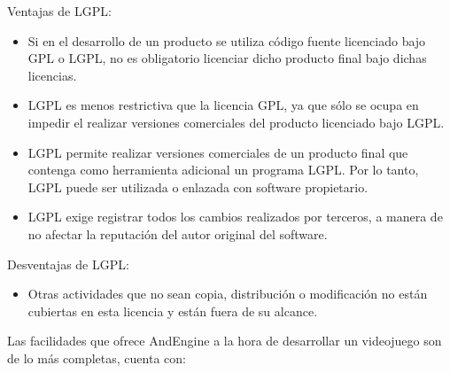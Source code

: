\documentclass[12 pt, a4paper, twoside]{article}
\begin{document}
Ventajas de LGPL:
\begin{itemize}
\item Si en el desarrollo de un producto se utiliza código fuente
  licenciado bajo GPL o LGPL, no es obligatorio licenciar dicho
  producto final bajo dichas licencias.
\item LGPL es menos restrictiva que la licencia GPL, ya que sólo se
  ocupa en impedir el realizar versiones comerciales del producto
  licenciado bajo LGPL.
\item LGPL permite realizar versiones comerciales de un
  producto final que contenga como herramienta adicional un programa
  LGPL. Por lo tanto, LGPL puede ser utilizada o enlazada con software
  propietario.
\item LGPL exige registrar todos los cambios realizados por terceros,
  a manera de no afectar la reputación del autor original del
  software.
\end{itemize}

Desventajas de LGPL:
\begin{itemize}
\item Otras actividades que no sean copia, distribución o modificación
  no están cubiertas en esta licencia y están fuera de su alcance.
\end{itemize}

\clearpage
Las facilidades que ofrece AndEngine a la hora de desarrollar un
videojuego son de lo más completas, cuenta con:
\end{document}
